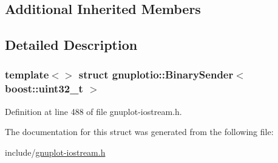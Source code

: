 \subsection*{Additional Inherited Members}


\subsection{Detailed Description}
\subsubsection*{template$<$$>$\newline
struct gnuplotio\+::\+Binary\+Sender$<$ boost\+::uint32\+\_\+t $>$}



Definition at line 488 of file gnuplot-\/iostream.\+h.



The documentation for this struct was generated from the following file\+:\begin{DoxyCompactItemize}
\item 
include/\hyperlink{gnuplot-iostream_8h}{gnuplot-\/iostream.\+h}\end{DoxyCompactItemize}
